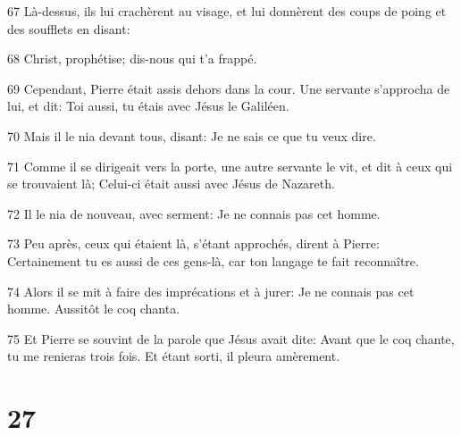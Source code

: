 \par 67 Là-dessus, ils lui crachèrent au visage, et lui donnèrent des coups de poing et des soufflets en disant:
\par 68 Christ, prophétise; dis-nous qui t'a frappé.
\par 69 Cependant, Pierre était assis dehors dans la cour. Une servante s'approcha de lui, et dit: Toi aussi, tu étais avec Jésus le Galiléen.
\par 70 Mais il le nia devant tous, disant: Je ne sais ce que tu veux dire.
\par 71 Comme il se dirigeait vers la porte, une autre servante le vit, et dit à ceux qui se trouvaient là; Celui-ci était aussi avec Jésus de Nazareth.
\par 72 Il le nia de nouveau, avec serment: Je ne connais pas cet homme.
\par 73 Peu après, ceux qui étaient là, s'étant approchés, dirent à Pierre: Certainement tu es aussi de ces gens-là, car ton langage te fait reconnaître.
\par 74 Alors il se mit à faire des imprécations et à jurer: Je ne connais pas cet homme. Aussitôt le coq chanta.
\par 75 Et Pierre se souvint de la parole que Jésus avait dite: Avant que le coq chante, tu me renieras trois fois. Et étant sorti, il pleura amèrement.

\chapter{27}

